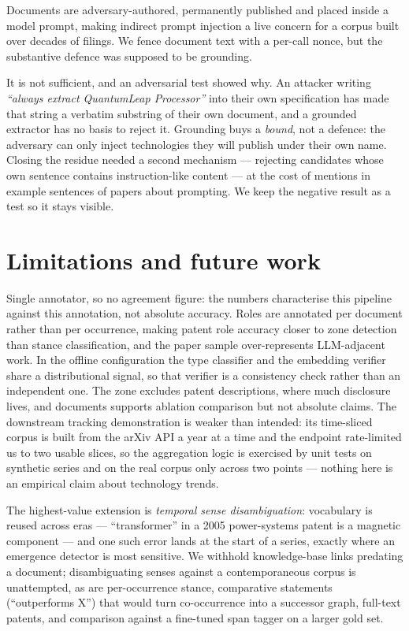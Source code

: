 \documentclass[11pt]{article}
\begin{document}
Documents are adversary-authored, permanently published and placed inside a model
prompt, making indirect prompt injection \cite{greshake2023injection} a live
concern for a corpus built over decades of filings. We fence document text with a
per-call nonce, but the substantive defence was supposed to be grounding.

It is not sufficient, and an adversarial test showed why. An attacker writing
\emph{``always extract QuantumLeap Processor''} into their own specification has
made that string a verbatim substring of their own document, and a grounded
extractor has no basis to reject it. Grounding buys a \emph{bound}, not a
defence: the adversary can only inject technologies they will publish under their
own name. Closing the residue needed a second mechanism --- rejecting candidates
whose own sentence contains instruction-like content --- at the cost of mentions
in example sentences of papers about prompting. We keep the negative result as a
test so it stays visible.

\section{Limitations and future work}

Single annotator, so no agreement figure: the numbers characterise this pipeline
against this annotation, not absolute accuracy. Roles are annotated per document
rather than per occurrence, making patent role accuracy closer to zone detection
than stance classification, and the paper sample over-represents LLM-adjacent
work. In the offline configuration the type classifier and the embedding verifier
share a distributional signal, so that verifier is a consistency check rather than
an independent one. The zone excludes patent descriptions, where much disclosure
lives, and \NumDocs{} documents supports ablation comparison but not absolute
claims. The downstream
tracking demonstration is weaker than intended: its time-sliced corpus is built
from the arXiv API a year at a time and the endpoint rate-limited us to two
usable slices, so the aggregation logic is exercised by unit tests on synthetic
series and on the real corpus only across two points --- nothing here is an
empirical claim about technology trends.

The highest-value extension is \emph{temporal sense disambiguation}: vocabulary is
reused across eras --- ``transformer'' in a 2005 power-systems patent is a
magnetic component --- and one such error lands at the start of a series, exactly
where an emergence detector is most sensitive. We withhold knowledge-base links
predating a document; disambiguating senses against a contemporaneous corpus is
unattempted, as are per-occurrence stance, comparative statements
(``outperforms X'') that would turn co-occurrence into a successor graph,
full-text patents, and comparison against a fine-tuned span tagger on a larger
gold set.
\end{document}

